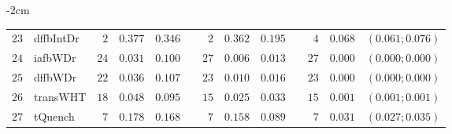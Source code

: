 \begin{table*}[!htbp]
\begin{adjustwidth*}{}{-2cm}
\begin{tabular}{@{}rlrrrrrrrrrcc@{}}
\footnotesize{$23$} & \footnotesize{dffbIntDr} & \footnotesize{$2 $} & \footnotesize{$0.377$} & \footnotesize{$0.346$} && \footnotesize{$2 $} & \footnotesize{$0.362$} & \footnotesize{$0.195$} && \footnotesize{$4 $} & \footnotesize{$0.068$} & \footnotesize{$(0.061;0.076)$} \\
\footnotesize{$24$} & \footnotesize{iafbWDr  } & \footnotesize{$24$} & \footnotesize{$0.031$} & \footnotesize{$0.100$} && \footnotesize{$27$} & \footnotesize{$0.006$} & \footnotesize{$0.013$} && \footnotesize{$27$} & \footnotesize{$0.000$} & \footnotesize{$(0.000;0.000)$} \\
\footnotesize{$25$} & \footnotesize{dffbWDr  } & \footnotesize{$22$} & \footnotesize{$0.036$} & \footnotesize{$0.107$} && \footnotesize{$23$} & \footnotesize{$0.010$} & \footnotesize{$0.016$} && \footnotesize{$23$} & \footnotesize{$0.000$} & \footnotesize{$(0.000;0.000)$} \\
\footnotesize{$26$} & \footnotesize{transWHT } & \footnotesize{$18$} & \footnotesize{$0.048$} & \footnotesize{$0.095$} && \footnotesize{$15$} & \footnotesize{$0.025$} & \footnotesize{$0.033$} && \footnotesize{$15$} & \footnotesize{$0.001$} & \footnotesize{$(0.001;0.001)$} \\
\footnotesize{$27$} & \footnotesize{tQuench  } & \footnotesize{$7 $} & \footnotesize{$0.178$} & \footnotesize{$0.168$} && \footnotesize{$7 $} & \footnotesize{$0.158$} & \footnotesize{$0.089$} && \footnotesize{$7 $} & \footnotesize{$0.031$} & \footnotesize{$(0.027;0.035)$} \\
\bottomrule
\end{tabular}
\end{adjustwidth*}
\end{table*}

